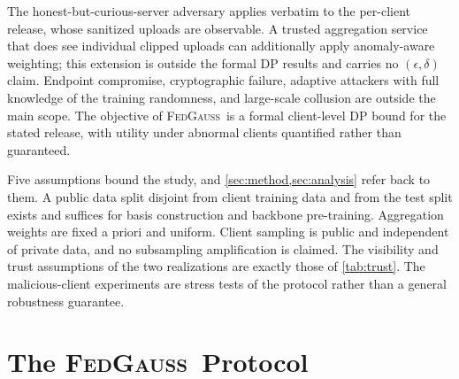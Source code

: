 \documentclass[a4paper,fleqn]{cas-dc}
\newcommand{\method}{\textsc{FedGauss}}
\begin{document}
\par
\par
The honest-but-curious-server adversary applies verbatim to the per-client release, whose sanitized uploads are observable. A trusted aggregation service that does see individual clipped uploads can additionally apply anomaly-aware weighting; this extension is outside the formal DP results and carries no $(\epsilon,\delta)$ claim. Endpoint compromise, cryptographic failure, adaptive attackers with full knowledge of the training randomness, and large-scale collusion are outside the main scope. The objective of \method\ is a formal client-level DP bound for the stated release, with utility under abnormal clients quantified rather than guaranteed.
\par
Five assumptions bound the study, and \cref{sec:method,sec:analysis} refer back to them. A public data split disjoint from client training data and from the test split exists and suffices for basis construction and backbone pre-training. Aggregation weights are fixed a priori and uniform. Client sampling is public and independent of private data, and no subsampling amplification is claimed. The visibility and trust assumptions of the two realizations are exactly those of \cref{tab:trust}. The malicious-client experiments are stress tests of the protocol rather than a general robustness guarantee.
\par
\section{The \method\ Protocol}
\label{sec:method}
\par
\par
\end{document}
